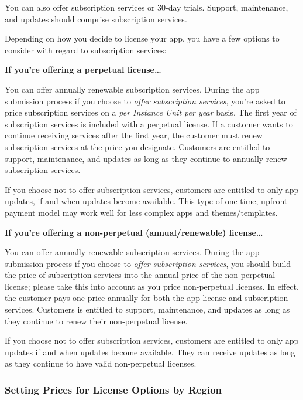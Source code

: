 You can also offer subscription services or 30-day trials. Support,
maintenance, and updates should comprise subscription services.

Depending on how you decide to license your app, you have a few options
to consider with regard to subscription services:

\textbf{If you're offering a perpetual license\ldots{}}

You can offer annually renewable subscription services. During the app
submission process if you choose to \emph{offer subscription services},
you're asked to price subscription services on a \emph{per Instance Unit
per year} basis. The first year of subscription services is included
with a perpetual license. If a customer wants to continue receiving
services after the first year, the customer must renew subscription
services at the price you designate. Customers are entitled to support,
maintenance, and updates as long as they continue to annually renew
subscription services.

If you choose not to offer subscription services, customers are entitled
to only app updates, if and when updates become available. This type of
one-time, upfront payment model may work well for less complex apps and
themes/templates.

\textbf{If you're offering a non-perpetual (annual/renewable)
license\ldots{}}

You can offer annually renewable subscription services. During the app
submission process if you choose to \emph{offer subscription services},
you should build the price of subscription services into the annual
price of the non-perpetual license; please take this into account as you
price non-perpetual licenses. In effect, the customer pays one price
annually for both the app license and subscription services. Customers
is entitled to support, maintenance, and updates as long as they
continue to renew their non-perpetual license.

If you choose not to offer subscription services, customers are entitled
to only app updates if and when updates become available. They can
receive updates as long as they continue to have valid non-perpetual
licenses.

\subsubsection{Setting Prices for License Options by
Region}\label{setting-prices-for-license-options-by-region}

